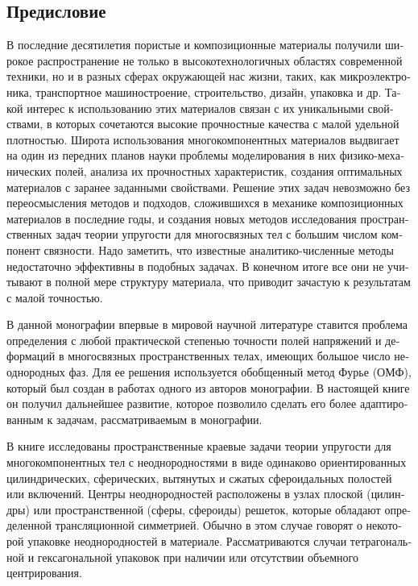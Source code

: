 
\begin{russian}
\setcounter{secnumdepth}{-1}
\chapter{Предисловие}
\setcounter{secnumdepth}{2}

В последние десятилетия пористые и композиционные материалы получили широкое распространение не только в высокотехнологичных областях современной техники, но и в разных сферах окружающей нас жизни, таких, как микроэлектроника, транспортное машиностроение, строительство, дизайн, упаковка и др. Такой интерес к использованию этих материалов связан с их уникальными свойствами, в которых сочетаются высокие прочностные качества с малой удельной плотностью. Широта использования многокомпонентных материалов выдвигает на один из передних планов науки проблемы моделирования в них физико-механических полей, анализа их прочностных характеристик, создания оптимальных материалов с заранее заданными свойствами. Решение этих задач невозможно без переосмысления методов и подходов, сложившихся в механике композиционных материалов в последние годы, и создания новых методов исследования пространственных задач теории упругости для многосвязных тел с большим числом компонент связности. Надо заметить, что известные аналитико-численные методы недостаточно эффективны в подобных задачах. В конечном итоге все они не учитывают в полной мере структуру материала, что приводит зачастую к результатам с малой точностью.\sloppy

В данной монографии впервые в мировой научной литературе ставится проблема определения с любой практической степенью точности полей напряжений и деформаций в многосвязных пространственных телах, имеющих большое число неоднородных фаз. Для ее решения используется обобщенный метод Фурье (ОМФ), который был создан в работах одного из авторов монографии. В настоящей книге он получил дальнейшее развитие, которое позволило сделать его более адаптированным к задачам, рассматриваемым в монографии.

В книге исследованы пространственные краевые задачи теории упругости для многокомпонентных тел с неоднородностями в виде одинаково ориентированных цилиндрических, сферических, вытянутых и сжатых сфероидальных полостей или включений. Центры неоднородностей расположены в узлах плоской (цилиндры) или пространственной (сферы, сфероиды) решеток, которые обладают определенной трансляционной симметрией. Обычно в этом случае говорят о некоторой упаковке неоднородностей в материале. Рассматриваются случаи тетрагональной и гексагональной упаковок при наличии или отсутствии объемного центрирования.


\end{russian}
